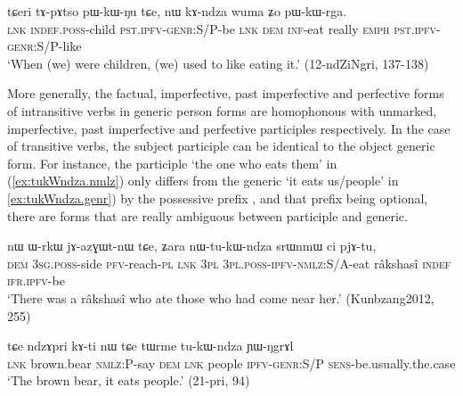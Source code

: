 \begin{exe}
\ex \label{ex:pWkWNu.genr}
 \gll tɕeri tɤ-pɤtso pɯ-kɯ-ŋu tɕe, nɯ kɤ-ndza wuma ʑo pɯ-kɯ-rga. \\
 \textsc{lnk} \textsc{indef}.\textsc{poss}-child \textsc{pst}.\textsc{ipfv}-\textsc{genr}:S/P-be \textsc{lnk} \textsc{dem} \textsc{inf}-eat really \textsc{emph} \textsc{pst}.\textsc{ipfv}-\textsc{genr}:S/P-like \\
 \glt `When (we) were children, (we) used to like eating it.' (12-ndZiNgri, 137-138)
\end{exe}

More generally, the factual, imperfective, past imperfective and perfective forms of intransitive verbs in generic person forms are homophonous with unmarked, imperfective, past imperfective and perfective participles respectively. In the case of transitive verbs, the subject participle can be identical to the object generic form. For instance, the participle  `the one who eats them' in (\ref{ex:tukWndza.nmlz}) only differs from the generic  `it eats us/people' in \ref{ex:tukWndza.genr}) by the possessive prefix , and  that prefix being optional, there are forms that are really ambiguous between participle and generic. 

\begin{exe}
\ex \label{ex:tukWndza.nmlz}
 \gll nɯ ɯ-rkɯ jɤ-azɣɯt-nɯ tɕe, ʑara nɯ-tu-kɯ-ndza srɯnmɯ ci pjɤ-tu, \\
 \textsc{dem} \textsc{3sg}.\textsc{poss}-side \textsc{pfv}-reach-\textsc{pl} \textsc{lnk} \textsc{3pl} \textsc{3pl}.\textsc{poss}-\textsc{ipfv}-\textsc{nmlz}:S/A-eat râkshasî \textsc{indef} \textsc{ifr}.\textsc{ipfv}-be \\
\glt `There was a râkshasî who ate those who had come near her.' (Kunbzang2012, 255)
\end{exe}

\begin{exe}
\ex \label{ex:tukWndza.genr}
 \gll tɕe ndzɤpri kɤ-ti nɯ tɕe tɯrme tu-kɯ-ndza ɲɯ-ŋgrɤl  \\
 \textsc{lnk} brown.bear \textsc{nmlz}:P-say \textsc{dem} \textsc{lnk} people \textsc{ipfv}-\textsc{genr}:S/P \textsc{sens}-be.usually.the.case \\
\glt `The brown bear, it eats people.' (21-pri, 94)
\end{exe}
 


